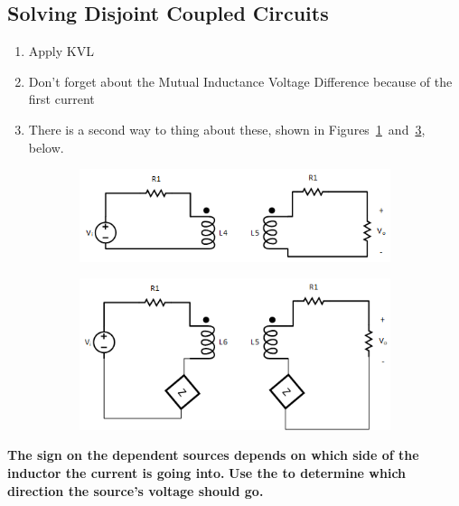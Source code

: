 \documentclass[10pt,letterpaper,final,twoside,notitlepage]{article}
\begin{document}
	\subsection*{Solving Disjoint Coupled Circuits} \label{subsec:Solve Disjoint Coupled Circuits}
		\begin{enumerate}[noitemsep] %
			\item Apply KVL
			\item Don't forget about the Mutual Inductance Voltage Difference because of the first current
			\item There is a second way to thing about these, shown in Figures~\ref{subfig:Disjoint Coupled Inductors OG}~and~\ref{subfig:Disjoint Coupled Inductors Simplified}, below.
		\end{enumerate}
		\begin{figure}[ht!] %
			\begin{subfigure}{0.5\textwidth}
				\centering
				\includegraphics[scale=0.35]{Disjoint_Coupled_Inductors-OG.png}
				\label{subfig:Disjoint Coupled Inductors OG}
			\end{subfigure}
			\begin{subfigure}{0.5\textwidth}
				\centering
				\includegraphics[scale=0.30]{Disjoint_Coupled_Inductors-Simplified.png}
				\label{subfig:Disjoint Coupled Inductors Simplified}
			\end{subfigure}
		\end{figure}
		\textbf{The sign on the dependent sources depends on which side of the inductor the current is going into.} \newline
		\textbf{Use the  to determine which direction the source's voltage should go.}
	\vspace{-6mm}
		
\end{document}
